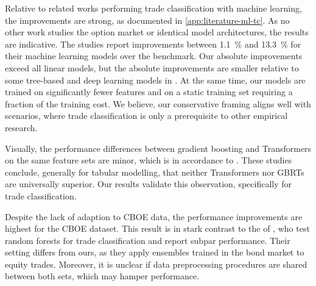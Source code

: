 Relative to related works performing trade classification with machine learning, the improvements are strong, as documented in \cref{app:literature-ml-tc}. As no other work studies the option market or identical model architectures, the results are indicative. The studies report improvements between \SI{1.1}{\percent} and \SI{13.3}{\percent} for their machine learning models over the benchmark. Our absolute improvements exceed all linear models, but the absolute improvements are smaller relative to some tree-based and deep learning models in \textcite[][49]{ronenMachineLearningTrade2022}. At the same time, our models are trained on significantly fewer features and on a static training set requiring a fraction of the training cost. We believe, our conservative framing aligns well with scenarios, where trade classification is only a prerequisite to other empirical research.

Visually, the performance differences between gradient boosting and Transformers on the same feature sets are minor, which is in accordance to \textcites{grinsztajnWhyTreebasedModels2022}{gorishniyRevisitingDeepLearning2021}. These studies conclude, generally for tabular modelling, that neither Transformers nor \glspl{GBRT} are universally superior. Our results validate this observation, specifically for trade classification.


Despite the lack of adaption to \gls{CBOE} data, the performance improvements are highest for the \gls{CBOE} dataset. This result is in stark contrast to the of \textcite[][32]{ronenMachineLearningTrade2022}, who test random forests for trade classification and report subpar performance. Their setting differs from ours, as they apply ensembles trained in the bond market to equity trades. Moreover, it is unclear if data preprocessing procedures are shared between both sets, which may hamper performance. 

